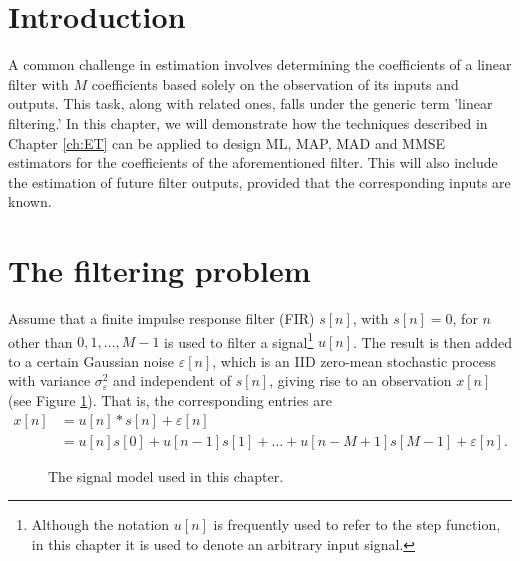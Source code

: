 
\section{Introduction}

A common challenge in estimation involves determining the coefficients of a linear filter with $M$ coefficients based solely on the observation of its inputs and outputs. This task, along with related ones, falls under the generic term 'linear filtering.' In this chapter, we will demonstrate how the techniques described in Chapter \ref{ch:ET} can be applied to design ML, MAP, MAD and MMSE estimators for the coefficients of the aforementioned filter. This will also include the estimation of future filter outputs, provided that the corresponding inputs are known.

\section{The filtering problem}

Assume that a finite impulse response filter (FIR) $s[n]$, with $s[n]=0$, for $n$ other than $0,1, \ldots, M-1$ is used to filter a signal\footnote{Although the notation $u[n]$ is frequently used to refer to the step function, in this chapter it is used to denote an arbitrary input signal.} $u[n]$. The result is then added to a certain Gaussian noise $\varepsilon[n]$, which is an IID zero-mean stochastic process with variance $\sigma_\varepsilon^2 $ and independent of $s[n]$, giving rise to an observation $x[n]$ (see Figure \ref{fig:linear_filter}). That is, the corresponding entries are
\begin{align}
x[n] &= u[n]*s[n] + \varepsilon[n]     \nonumber\\
     & = u[n]s[0] + u[n-1]s[1] + \ldots + u[n-M+1]s[M-1] + \varepsilon[n].
\end{align}

\begin{figure}[htb]  %
    \centering
\caption{The signal model used in this chapter.}
\label{fig:linear_filter}
\end{figure}


